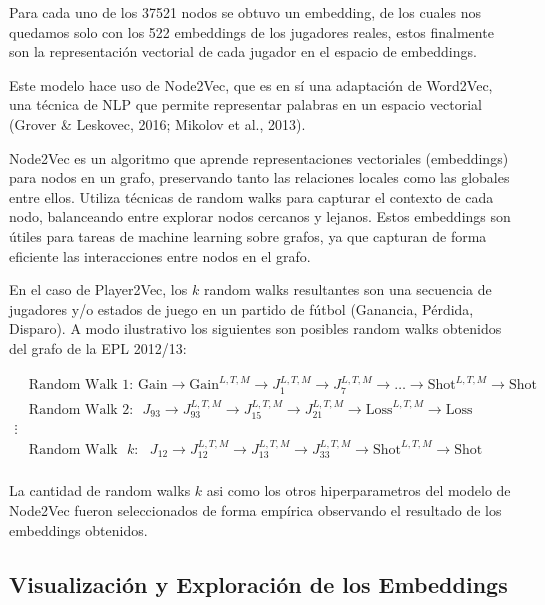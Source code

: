 \documentclass[
  a4paper,
]{article}
\begin{document}
Para cada uno de los 37521 nodos se obtuvo un embedding, de los cuales
nos quedamos solo con los 522 embeddings de los jugadores reales, estos
finalmente son la representación vectorial de cada jugador en el espacio
de embeddings.

Este modelo hace uso de Node2Vec, que es en sí una adaptación de
Word2Vec, una técnica de NLP que permite representar palabras en un
espacio vectorial (Grover \& Leskovec, 2016; Mikolov et al., 2013).

Node2Vec es un algoritmo que aprende representaciones vectoriales
(embeddings) para nodos en un grafo, preservando tanto las relaciones
locales como las globales entre ellos. Utiliza técnicas de random walks
para capturar el contexto de cada nodo, balanceando entre explorar nodos
cercanos y lejanos. Estos embeddings son útiles para tareas de machine
learning sobre grafos, ya que capturan de forma eficiente las
interacciones entre nodos en el grafo.

En el caso de Player2Vec, los \(k\) random walks resultantes son una
secuencia de jugadores y/o estados de juego en un partido de fútbol
(Ganancia, Pérdida, Disparo). A modo ilustrativo los siguientes son
posibles random walks obtenidos del grafo de la EPL 2012/13:

\[
\begin{aligned}
    & \text{Random Walk 1:} \text{ Gain} \rightarrow \text{Gain}^{L, T, M} \rightarrow J_1^{L, T, M} \rightarrow J_7^{L, T, M} \rightarrow \dots \rightarrow \text{Shot}^{L, T, M} \rightarrow \text{Shot} \\
    & \text{Random Walk 2:} \text{ } J_{93} \rightarrow J_{93}^{L, T, M} \rightarrow J_{15}^{L, T, M} \rightarrow J_{21}^{L, T, M} \rightarrow \text{Loss}^{L, T, M} \rightarrow \text{Loss} \\
    \vdots \\
    & \text{Random Walk} \text{ } k: \text{ } J_{12} \rightarrow J_{12}^{L, T, M} \rightarrow J_{13}^{L, T, M} \rightarrow J_{33}^{L, T, M} \rightarrow \text{Shot}^{L, T, M} \rightarrow \text{Shot} \\
\end{aligned}
\]

La cantidad de random walks \(k\) asi como los otros hiperparametros del
modelo de Node2Vec fueron seleccionados de forma empírica observando el
resultado de los embeddings obtenidos.

\hypertarget{visualizaciuxf3n-y-exploraciuxf3n-de-los-embeddings}{%
\subsection{Visualización y Exploración de los
Embeddings}\label{visualizaciuxf3n-y-exploraciuxf3n-de-los-embeddings}}
\end{document}
